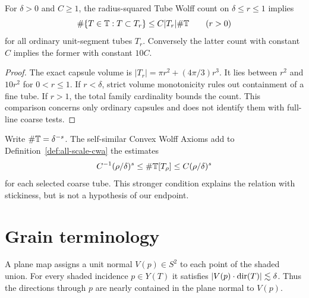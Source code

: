 \begin{lemma}
\label{lem:ordinary-tube-wolff-volume}
\leanok
{}
For $\delta>0$ and $C\geq1$, the radius-squared Tube Wolff count on
$\delta\leq r\leq1$ implies
\[
 \#\{T\in\mathbb{T}:T\subset T_r\}\leq C|T_r|\#\mathbb{T}
       \qquad(r>0)
\]
for all ordinary unit-segment tubes $T_r$.
Conversely the latter count with constant $C$ implies the former with
constant $10C$.
\end{lemma}
\begin{proof}
\leanok
The exact capsule volume is $|T_r|=\pi r^2+(4\pi/3)r^3$.
It lies between $r^2$ and $10r^2$ for $0<r\leq1$.
If $r<\delta$, strict volume monotonicity rules out containment of a
fine tube. If $r>1$, the total family cardinality bounds the count.
This comparison concerns only ordinary capsules and does not identify
them with full-line coarse tests.
\end{proof}

\begin{definition}
\label{def:self-similar-cwa}
Write $\#\mathbb{T}=\delta^{-s}$. The self-similar Convex Wolff Axioms add to
Definition~\ref{def:all-scale-cwa} the estimates
\[
 C^{-1}(\rho/\delta)^s\leq\#\mathbb{T}[T_\rho]
 \leq C(\rho/\delta)^s
\]
for each selected coarse tube. This stronger condition explains the
relation with stickiness, but is not a hypothesis of our endpoint.
\end{definition}

\section{Grain terminology}

\begin{definition}
\label{def:plane-map}
A plane map assigns a unit normal $V(p)\in S^2$ to each point of the
shaded union. For every shaded incidence $p\in Y(T)$ it satisfies
$|V(p)\cdot\operatorname{dir}(T)|\lesssim\delta$. Thus the directions through $p$
are nearly contained in the plane normal to $V(p)$.
\end{definition}

